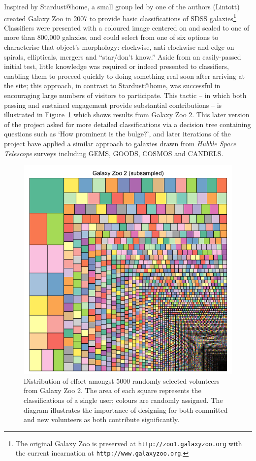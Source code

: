 \documentclass{ar2e}
\def\Fref#1{Figure~\ref{#1}\xspace}
\def\url#1{\texttt{#1}}
\begin{document}
Inspired by Stardust@home, a small group led by one of the authors (Lintott) created
Galaxy Zoo in 2007 to provide basic classifications of SDSS
galaxies\footnote{The original Galaxy Zoo is preserved at
\url{http://zoo1.galaxyzoo.org} with the current incarnation at
\url{http://www.galaxyzoo.org}.} Classifiers were presented with a coloured
image centered on and scaled to one of more than 800,000 galaxies, and could
select from one of six options to characterise that object's morphology: 
clockwise, anti clockwise and edge-on spirals,
ellipticals, mergers and ``star/don't know.'' Aside from  an easily-passed
initial test, little knowledge was required or indeed presented to classifiers,
enabling them to proceed quickly to doing something real soon after arriving at the
site; this approach, in contrast to Stardust@home, was
successful in encouraging large numbers of visitors to participate. 
This tactic -- in which both passing and sustained engagement provide
substantial contributions -- is illustrated in \Fref{fig:gz2} which shows results from
Galaxy Zoo 2. This later version of the project asked for more detailed
classifications via a decision tree containing questions such as `How prominent
is the bulge?', and later iterations of the project have applied a similar
approach to galaxies drawn from \emph{Hubble Space Telescope} surveys including
\textsc{GEMS, GOODS, COSMOS} and \textsc{CANDELS}. 


\begin{figure}[!ht]
\centering\includegraphics[width=\linewidth]{figs/gz2squares.png}
\caption{Distribution of effort amongst 5000 randomly selected volunteers from
Galaxy Zoo 2. The area of each square represents the classifications of a single
user; colours are randomly assigned. The diagram illustrates the importance of
designing for both committed and new volunteers as both contribute significantly.}
\label{fig:gz2}
\end{figure}
\end{document}
